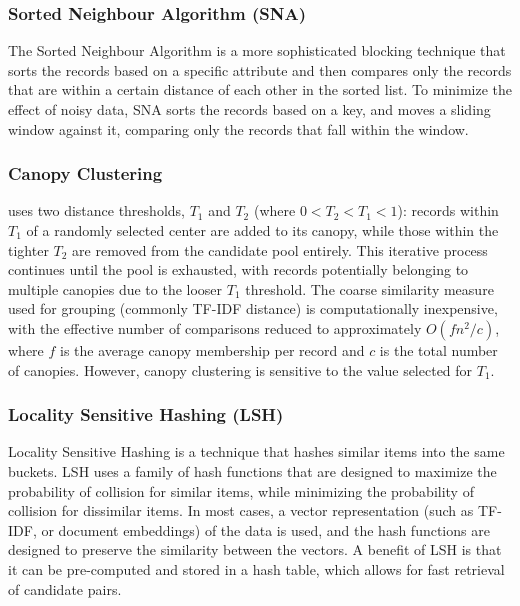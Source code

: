 \subsubsection{Sorted Neighbour Algorithm (SNA)}\label{subsubsec:sna}
The Sorted Neighbour Algorithm is a more sophisticated blocking technique that sorts the records based on a specific attribute and then compares only the records that are within a certain distance of each other in the sorted list.
To minimize the effect of noisy data, SNA sorts the records based on a key, and moves a sliding window against it, comparing only the records that fall within the window.\cite{moslemi2024evaluating}

\subsubsection{Canopy Clustering}\label{subsubsec:canopy-clustering} uses two distance thresholds, $T_1$ and $T_2$ (where $0 < T_2 < T_1 < 1$): records within $T_1$ of a randomly selected center are added to its canopy, while those within the tighter $T_2$ are removed from the candidate pool entirely.
This iterative process continues until the pool is exhausted, with records potentially belonging to multiple canopies due to the looser $T_1$ threshold.
The coarse similarity measure used for grouping (commonly TF-IDF distance) is computationally inexpensive, with the effective number of comparisons reduced to approximately $O(fn^2/c)$, where $f$ is the average canopy membership per record and $c$ is the total number of canopies.
However, canopy clustering is sensitive to the value selected for $T_1$.\cite{moslemi2024evaluating}

\subsubsection{Locality Sensitive Hashing (LSH)}\label{subsubsec:lsh}
Locality Sensitive Hashing is a technique that hashes similar items into the same buckets.
LSH uses a family of hash functions that are designed to maximize the probability of collision for similar items, while minimizing the probability of collision for dissimilar items.
In most cases, a vector representation (such as TF-IDF, or document embeddings) of the data is used, and the hash functions are designed to preserve the similarity between the vectors.
A benefit of LSH is that it can be pre-computed and stored in a hash table, which allows for fast retrieval of candidate pairs.\cite{brinkmann2024sc}

